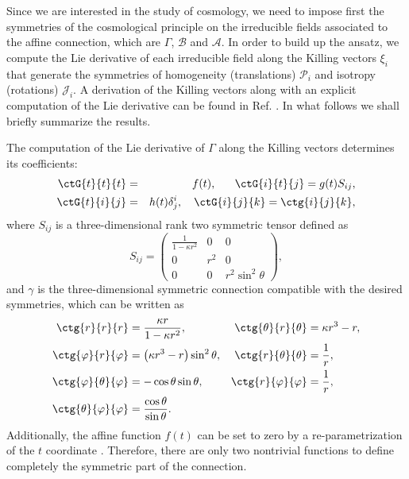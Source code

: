 Since we are interested in the study of cosmology, we need to impose first the symmetries of the cosmological principle on 
the irreducible fields associated to the affine connection, which are $\Gamma$, $\mathcal{B}$ and $\mathcal{A}$. 
In order to build up the ansatz, we compute the Lie derivative of each irreducible field along the Killing vectors $\xi_i$ that generate the symmetries of homogeneity (translations) $\mathcal{P}_i$ and isotropy (rotations) $\mathcal{J}_i$. 
A derivation of the Killing vectors along with an explicit computation of the Lie derivative can be found 
in Ref. \cite{Castillo-Felisola17}. In what follows we shall briefly summarize the results.

The computation of the Lie derivative of $\Gamma$ along the Killing vectors determines its coefficients: 
\begin{eqnarray}
    \label{G_ansatz}
    \ctG{t}{t}{t} & =& f(t), \ \ \ \ \ \ctG{i}{t}{j}  = g(t) S_{i j}, \\
    \ctG{t}{i}{j} &=& h(t) \delta^{i}_{j} , \ \ \ \ctG{i}{j}{k}  = \ctg{i}{j}{k}, \nonumber
\end{eqnarray}
where $S_{ij}$ is a three-dimensional rank two symmetric tensor defined as 
\begin{equation*}
    S_{i j}=\left(\begin{array}{ccc}
    \frac{1}{1-\kappa r^2} & 0 & 0 \\
    0 & r^2 & 0 \\
    0 & 0 & r^2 \sin ^2 \theta
    \end{array}\right),
\end{equation*}
and $\gamma$ is the three-dimensional symmetric connection compatible with the desired symmetries, which can be written as
\begin{align*}
    \ctg{r}{r}{r} & = \frac{\kappa r}{1 - \kappa r^2}, & \ctg{\theta}{r}{\theta} & = \kappa r^3 - r, \\
    \ctg{\varphi}{r}{\varphi} & = \left(\kappa r^3 - r\right)\sin^2\theta, & \ctg{r}{\theta}{\theta} & = \frac{1}{r}, \\
    \ctg{\varphi}{\theta}{\varphi} & = -\cos\theta\sin\theta, & \ctg{r}{\varphi}{\varphi} & = \frac{1}{r}, \\
    \ctg{\theta}{\varphi}{\varphi} & = \frac{\cos \theta}{\sin \theta}.
\end{align*}
Additionally, the affine function $f(t)$ can be set to zero by a re-parametrization of the $t$ coordinate \cite{Castillo_Felisola_2022_EPJC}. 
Therefore, there are only two nontrivial functions to define completely the symmetric part of the connection.

